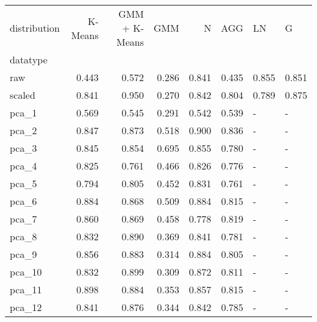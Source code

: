 \begin{tabular}{lrrrrrll}
\toprule
distribution &  K-Means &  GMM + K-Means &    GMM &      N &    AGG &     LN &      G \\
datatype &          &                &        &        &        &        &        \\
\midrule
raw      &    0.443 &          0.572 &  0.286 &  0.841 &  0.435 &  0.855 &  0.851 \\
scaled   &    0.841 &          0.950 &  0.270 &  0.842 &  0.804 &  0.789 &  0.875 \\
pca\_1    &    0.569 &          0.545 &  0.291 &  0.542 &  0.539 &      - &      - \\
pca\_2    &    0.847 &          0.873 &  0.518 &  0.900 &  0.836 &      - &      - \\
pca\_3    &    0.845 &          0.854 &  0.695 &  0.855 &  0.780 &      - &      - \\
pca\_4    &    0.825 &          0.761 &  0.466 &  0.826 &  0.776 &      - &      - \\
pca\_5    &    0.794 &          0.805 &  0.452 &  0.831 &  0.761 &      - &      - \\
pca\_6    &    0.884 &          0.868 &  0.509 &  0.884 &  0.815 &      - &      - \\
pca\_7    &    0.860 &          0.869 &  0.458 &  0.778 &  0.819 &      - &      - \\
pca\_8    &    0.832 &          0.890 &  0.369 &  0.841 &  0.781 &      - &      - \\
pca\_9    &    0.856 &          0.883 &  0.314 &  0.884 &  0.805 &      - &      - \\
pca\_10   &    0.832 &          0.899 &  0.309 &  0.872 &  0.811 &      - &      - \\
pca\_11   &    0.898 &          0.884 &  0.353 &  0.857 &  0.815 &      - &      - \\
pca\_12   &    0.841 &          0.876 &  0.344 &  0.842 &  0.785 &      - &      - \\
\bottomrule
\end{tabular}
